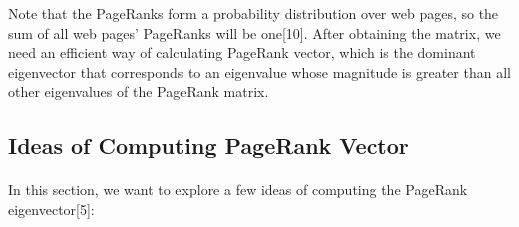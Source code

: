 \documentclass[12pt]{article}
\begin{document}
Note that the PageRanks form a probability distribution over web pages, so the sum of all web pages’ PageRanks will be one[10]. After obtaining the matrix, we need an efficient way of calculating PageRank vector, which is the dominant eigenvector that corresponds to an eigenvalue whose magnitude is greater than all other eigenvalues of the PageRank matrix.\\



\subsection{Ideas of Computing PageRank Vector}

\paragraph{} In this section, we want to explore a few ideas of computing the PageRank eigenvector[5]:
\end{document}
